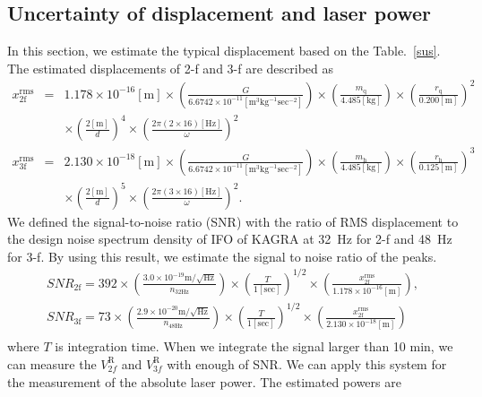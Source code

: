 \documentclass[A4]{spie}  %
\begin{document}
\subsection{Uncertainty of displacement and  laser power}
In this section, we estimate the typical displacement based on the Table.~\ref{sus}. 
 The estimated displacements of 2-f and 3-f are described as
\begin{eqnarray}
x^{\mathrm{rms}}_{\mathrm{2f}}&=&1.178 \times 10^{-16}\mathrm{[m]} \times \left( \frac{G}{6.6742 \times 10^{-11} \mathrm{[m^3kg^{-1}sec^{-2}]}} \right) \times \left( \frac{m_{\mathrm{q}}}{4.485 \mathrm{[kg]}} \right) \times \left( \frac{r_{\mathrm{q}}}{0.200 \mathrm{[m]}} \right)^2 \nonumber \\
 &&\times \left( \frac{2\mathrm{[m]}}{d} \right)^4 \times \left( \frac{2\pi(2\times 16)\mathrm{[Hz]}}{\omega} \right)^2\\
x^{\mathrm{rms}}_{\mathrm{3f}}&=&2.130 \times 10^{-18}\mathrm{[m]} \times \left( \frac{G}{6.6742 \times 10^{-11} \mathrm{[m^3kg^{-1}sec^{-2}]}} \right) \times \left( \frac{m_{\mathrm{h}}}{4.485 \mathrm{[kg]}} \right) \times \left( \frac{r_{\mathrm{h}}}{0.125 \mathrm{[m]}} \right)^3 \nonumber \\
 &&\times \left( \frac{2\mathrm{[m]}}{d} \right)^5 \times \left( \frac{2\pi(3\times 16)\mathrm{[Hz]}}{\omega} \right)^2.
\end{eqnarray}
We defined the signal-to-noise ratio (SNR) with the ratio of RMS displacement to the design noise spectrum density of IFO of KAGRA at 32~Hz for 2-f and 48~Hz for 3-f.
By using this result, we estimate the signal to noise ratio of the peaks.
\begin{eqnarray}
SNR_{\mathrm{2f}}=392 \times \left(\frac{3.0 \times 10^{-19} \mathrm{m/\sqrt{Hz}}}{n_{\mathrm{32Hz}}} \right) \times \left(\frac{T}{1 [\mathrm{sec}]} \right)^{1/2} \times \left(\frac{x_{\mathrm{2f}}^{\mathrm{rms}}}{1.178 \times 10^{-16}\mathrm{[m]} }  \right),   \\
SNR_{\mathrm{3f}}=73 \times \left(\frac{2.9 \times 10^{-20} \mathrm{m/\sqrt{Hz}}}{n_{\mathrm{48Hz}}} \right) \times \left(\frac{T}{1 [\mathrm{sec}]} \right)^{1/2} \times \left(\frac{x_{\mathrm{2f}}^{\mathrm{rms}}}{2.130 \times 10^{-18}\mathrm{[m] }} \right)   \\
\end{eqnarray}
where $T$ is integration time. When we integrate the signal larger than 10 min, we can measure the $V^{\mathrm{R}}_{2f}$ and $V^{\mathrm{R}}_{3f}$ with enough of SNR.
We can apply this system for the measurement of the absolute laser power. The estimated powers are
\end{document}
